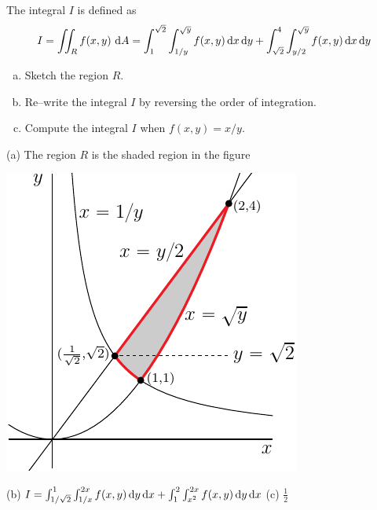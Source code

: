 \begin{question}[M200 2006D] %
The integral $I$ is defined as
\begin{equation*}
I =\iint_R f(x,y)\ \mathrm{d}A
  = \int_1^{\sqrt{2}} \int_{1/y}^{\sqrt{y}} f(x,y)\,\mathrm{d}x\,\mathrm{d}y
    +\int_{\sqrt{2}}^4 \int_{y/2}^{\sqrt{y}} f(x,y)\,\mathrm{d}x\,\mathrm{d}y
\end{equation*}


\begin{enumerate}[(a)]
\item
 Sketch the region $R$.

\item
 Re--write the integral $I$ by reversing the order of integration.

\item Compute the integral $I$ when $f(x,y)= x/y$.
\end{enumerate}
\end{question}

%

\begin{answer}
(a) The region $R$ is the shaded region in the figure

\begin{center}
     \includegraphics{fig/OE06D_4.pdf}
\end{center}

(b) $I= \int_{1/\sqrt{2}}^1 \int_{1/x}^{2x} f(x,y)\,\mathrm{d}y\,\mathrm{d}x
    +\int_1^2 \int_{x^2}^{2x} f(x,y)\,\mathrm{d}y\,\mathrm{d}x$ \qquad
(c) $\frac{1}{2}$
\end{answer}

